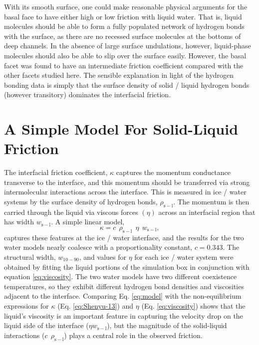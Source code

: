 
With its smooth surface, one could make reasonable physical arguments
for the basal face to have either high or low friction with liquid
water. That is, liquid molecules should be able to form a fully
populated network of hydrogen bonds with the surface, as there are no
recessed surface molecules at the bottoms of deep channels. In the
absence of large surface undulations, however, liquid-phase molecules
should also be able to slip over the surface easily. However, the
basal facet was found to have an intermediate friction coefficient
compared with the other facets studied here. The sensible explanation
in light of the hydrogen bonding data is simply that the surface
density of solid / liquid hydrogen bonds (however transitory)
dominates the interfacial friction.

\section{A Simple Model For Solid-Liquid Friction}
The interfacial friction coefficient, $\kappa$ captures the momentum
conductance transverse to the interface, and this momentum should be
transferred via strong intermolecular interactions across the
interface. This is measured in ice / water systems by the surface
density of hydrogen bonds, $\rho_\mathrm{s-l}$.  The momentum is then
carried through the liquid via viscous forces $(\eta)$ across an
interfacial region that has width $w_\mathrm{s-l}$. A simple linear
model,
\begin{equation}
  \kappa = c~~\rho_\mathrm{s-l}~~\eta~~w_\mathrm{s-l},
\label{eq:model}
\end{equation}
captures these features at the ice / water interface, and the results
for the two water models nearly coalesce with a proportionality
constant, $c = 0.343$.  The structural width, $w_\mathrm{10-90}$, and
values for $\eta$ for each ice / water system were obtained by fitting
the liquid portions of the simulation box in conjunction with equation
\eqref{eq:viscosity}.  The two water models have two different
coexistence temperatures, so they exhibit different hydrogen bond
densities and viscosities adjacent to the interface.  Comparing
Eq. \eqref{eq:model} with the non-equilibrium expressions for $\kappa$
(Eq. \eqref{eq:Shenyu-13}) and $\eta$ (Eq. \eqref{eq:viscosity}) shows
that the liquid's viscosity is an important feature in capturing the
velocity drop on the liquid side of the interface
($\eta w_\mathrm{s-l}$), but the magnitude of the solid-liquid
interactions ($c~~\rho_\mathrm{s-l}$) plays a central role in the
observed friction.

